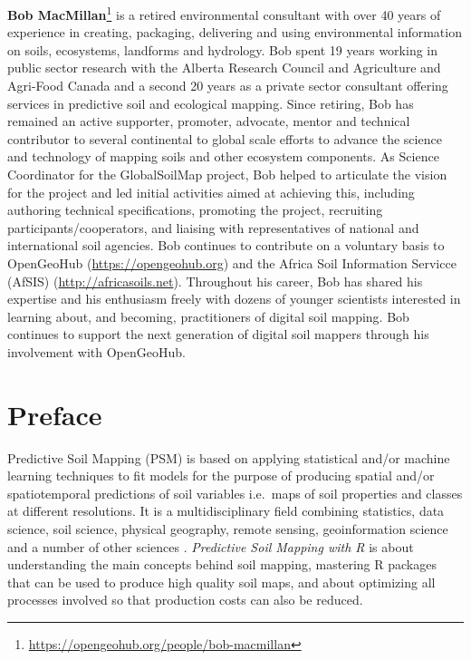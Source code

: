 \documentclass[graybox,natbib,nospthms,UStrade]{svmono}
\renewcommand{\href}[2]{#2 (\url{#1})}
\renewcommand{\href}[2]{#2\footnote{\url{#1}}}
\begin{document}
\href{https://opengeohub.org/people/bob-macmillan}{\textbf{Bob MacMillan}} is a retired environmental consultant with over 40 years of experience in creating, packaging, delivering and using environmental information on soils, ecosystems, landforms and hydrology. Bob spent 19 years working in public sector research with the Alberta Research Council and Agriculture and Agri-Food Canada and a second 20 years as a private sector consultant offering services in predictive soil and ecological mapping. Since retiring, Bob has remained an active supporter, promoter, advocate, mentor and technical contributor to several continental to global scale efforts to advance the science and technology of mapping soils and other ecosystem components. As Science Coordinator for the GlobalSoilMap project, Bob helped to articulate the vision for the project and led initial activities aimed at achieving this, including authoring technical specifications, promoting the project, recruiting participants/cooperators, and liaising with representatives of national and international soil agencies. Bob continues to contribute on a voluntary basis to OpenGeoHub (\url{https://opengeohub.org}) and the Africa Soil Information Servicce (AfSIS) (\url{http://africasoils.net}). Throughout his career, Bob has shared his expertise and his enthusiasm freely with dozens of younger scientists interested in learning about, and becoming, practitioners of digital soil mapping. Bob continues to support the next generation of digital soil mappers through his involvement with OpenGeoHub.

\hypertarget{preface}{%
\chapter*{Preface}\label{preface}}

Predictive Soil Mapping (PSM) is based on applying statistical and/or machine learning techniques to fit models for the purpose of producing spatial and/or spatiotemporal predictions of soil variables i.e.~maps of soil properties and classes at different resolutions. It is a multidisciplinary field combining statistics, data science, soil science, physical geography, remote sensing, geoinformation science and a number of other sciences \citep{Scul01, MCBRATNEY20033, Henderson2004Geoderma, Boettinger2010Springer, Zhu2015PSM}. \emph{Predictive Soil Mapping with R} is about understanding the main concepts behind soil mapping, mastering R packages that can be used to produce high quality soil maps, and about optimizing all processes involved so that production costs can also be reduced.
\end{document}
